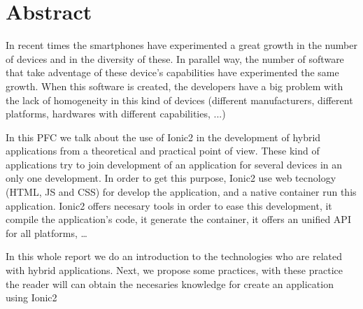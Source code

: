 \chapter*{Abstract}

In recent times the smartphones have experimented a great growth in the number of devices and in the diversity of these. In parallel way, the number of software that take adventage of these device's capabilities  have experimented the same growth.  When this software is created, the developers have a big problem with the lack of homogeneity in this kind of devices (different manufacturers, different platforms, hardwares with different capabilities, ...)

In this PFC we talk about the use of Ionic2 in the development of hybrid applications from a theoretical and practical point of view. These kind of applications try to join development of an application for several devices in an only one development. In order to get this purpose, Ionic2 use web tecnology (HTML, JS and CSS) for develop the application, and a native container run this application. Ionic2 offers necesary tools in order to ease this development, it compile the application's code, it generate the container, it offers an unified API for all platforms,  \ldots

In this whole report we do an introduction to the technologies who are related with hybrid applications. Next, we propose some practices, with these practice the reader will can obtain the necesaries knowledge for create an application using Ionic2
